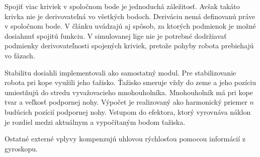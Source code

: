 Spojiť viac kriviek v spoločnom bode je jednoduchá záležitosť. Avšak takáto krivka nie je derivovateľná vo všetkých bodoch. Deriváciu nemá definovanú práve v spoločnom bode. V článku uvádzajú aj spôsob, za ktorých podmienok je možné dosiahnuť spojitú funkciu. V simulovanej lige nie je potrebné dodržiavať podmienky derivovateľnosti spojených kriviek, pretože pohyby robota prebiehajú vo fázach.

Stabilitu dosiahli implementovali ako samostatný modul. Pre stabilizovanie robota pri kope využili jeho ťažisko. Ťažisko smeruje vždy do zeme a jeho pozíciu umiestňujú do stredu vyvažovacieho mnohouholníka. Mnohouholník má pri kope tvar a veľkosť podpornej nohy. Výpočet je realizovaný ako harmonický priemer $n$ budúcich pozícií podpornej nohy. Vstupom do efektora, ktorý vyrovnáva náklon je rozdiel medzi aktuálnym a vypočítaným bodom ťažiska.

Ostatné externé vplyvy kompenzujú uhlovou rýchlosťou pomocou informácií z gyroskopu. %